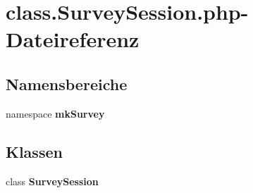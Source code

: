 \section{class.SurveySession.php-Dateireferenz}
\label{class_8SurveySession_8php}
\subsection*{Namensbereiche}
\begin{CompactItemize}
\item 
namespace {\bf mkSurvey}
\end{CompactItemize}
\subsection*{Klassen}
\begin{CompactItemize}
\item 
class {\bf SurveySession}
\end{CompactItemize}
